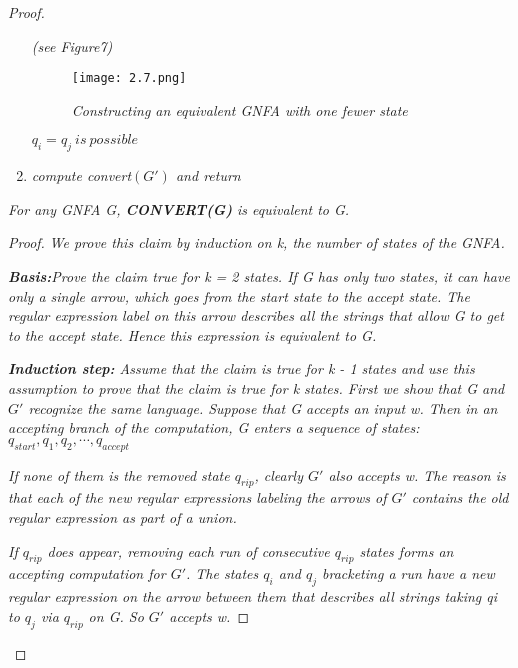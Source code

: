 \documentclass{article}
\begin{document}
\begin{proof}
\begin{enumerate}
    \textit{(see Figure7)}

    \begin{figure}[H]
        \begin{center}
            \texttt{[image: 2.7.png]}
        \end{center}
        \caption{\textit{Constructing an equivalent GNFA with one fewer state}}
    \end{figure}

    \begin{remark}
        $q_i=q_j ~ is ~ possible$
    \end{remark}

        \item \textit{compute convert$(G')$ and return}
\end{enumerate}

\begin{claim}
    \textit{For any GNFA G, \textbf{CONVERT(G)} is equivalent to G.}
    \begin{proof}
        \textit{We prove this claim by induction on k, the number of states of the GNFA.}
        
        \textit{\textbf{Basis:}Prove the claim true for k = 2 states. If G has only two states, it can
        have only a single arrow, which goes from the start state to the accept state. The
        regular expression label on this arrow describes all the strings that allow G to get
        to the accept state. Hence this expression is equivalent to G.}

        \textit{\textbf{Induction step:} Assume that the claim is true for k - 1 states and use this assumption to prove that the claim is true for k states. First we show that G and
        $G'$ recognize the same language. Suppose that G accepts an input w. Then in an
        accepting branch of the computation, G enters a sequence of states: {$q_{start},q_1,q_2,\cdots,q_{accept}$}}

        \textit{If none of them is the removed state $q_{rip}$, clearly $G'$ also accepts w. The reason is that each of the new regular expressions labeling the arrows of $G'$
        contains the old regular expression as part of a union.}
        
        \textit{If $q_{rip}$ does appear, removing each run of consecutive $q_{rip}$ states forms an
        accepting computation for $G'$. The states $q_i$ and $q_j$ bracketing a run have a new
        regular expression on the arrow between them that describes all strings taking qi
        to $q_j$ via $q_{rip}$ on G. So $G'$ accepts w.
        }


\end{proof}
\end{claim}
\end{proof}
\end{document}

